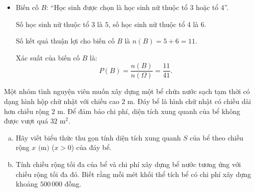 \begin{bt}
{\begin{enumerate}[a)]
\begin{itemize}
				Số học sinh thuộc tổ 1 là $9$ học sinh, nên số kết quả thuận lợi cho $A$ là $n(A) = 9$.
				
				Xác suất của biến cố $A$ là:
				$$P(A) = \dfrac{n(A)}{n(\Omega)} = \dfrac{9}{41}.$$
				\item Biến cố $B$: ``Học sinh được chọn là học sinh nữ thuộc tổ 3 hoặc tổ 4''.
				
				Số học sinh nữ thuộc tổ 3 là $5$, số học sinh nữ thuộc tổ 4 là $6$.
				
				Số kết quả thuận lợi cho biến cố $B$ là $n(B) = 5 + 6 = 11$.
				
				Xác suất của biến cố $B$ là:
				$$P(B) = \dfrac{n(B)}{n(\Omega)} = \dfrac{11}{41}.$$
			\end{itemize}
		\end{enumerate}
	}
\end{bt}

\begin{bt}%
	Một nhóm tình nguyện viên muốn xây dựng một bể chứa nước sạch tạm thời có dạng hình hộp chữ nhật với chiều cao $2\text{ m}$. Đáy bể là hình chữ nhật có chiều dài hơn chiều rộng $2\text{ m}$. Để đảm bảo chi phí, diện tích xung quanh của bể không được vượt quá $32\text{ m}^2$.
	\begin{enumerate}[a)]
		\item Hãy viết biểu thức thu gọn tính diện tích xung quanh $S$ của bể theo chiều rộng $x\text{ (m)}$ ($x > 0$) của đáy bể.
		\item Tính chiều rộng tối đa của bể và chi phí xây dựng bể nước tương ứng với chiều rộng tối đa đó. Biết rằng mỗi mét khối thể tích bể có chi phí xây dựng khoảng $500\,000$ đồng.
	\end{enumerate}
\end{bt}

